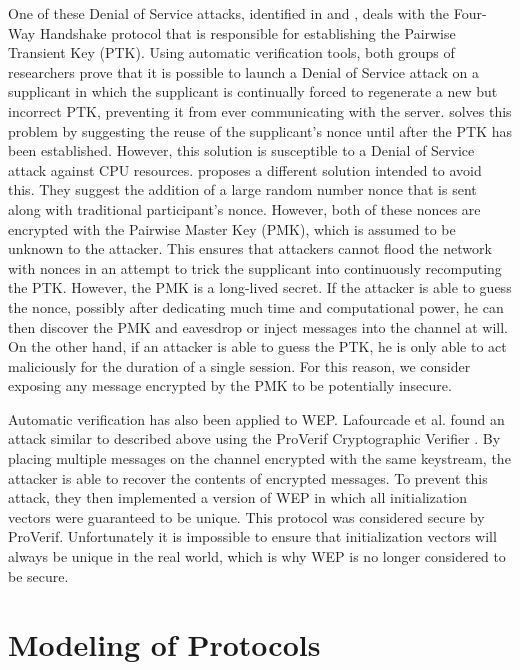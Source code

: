 \documentclass[11pt, twocolumn]{article} %
\begin{document}
One of these Denial of Service attacks, identified in \cite{he04} and \cite{liu08}, deals with the Four-Way Handshake protocol that is responsible for establishing the Pairwise Transient Key (PTK).  Using automatic verification tools, both groups of researchers prove that it is possible to launch a Denial of Service attack on a supplicant in which the supplicant is continually forced to regenerate a new but incorrect PTK, preventing it from ever communicating with the server.  \cite{he04} solves this problem by suggesting the reuse of the supplicant's nonce until after the PTK has been established.  However, this solution is susceptible to a Denial of Service attack against CPU resources.  \cite{liu08} proposes a different solution intended to avoid this.  They suggest the addition of a large random number nonce that is sent along with traditional participant's nonce.  However, both of these nonces are encrypted with the Pairwise Master Key (PMK), which is assumed to be unknown to the attacker.  This ensures that attackers cannot flood the network with nonces in an attempt to trick the supplicant into continuously recomputing the PTK.  However, the PMK is a long-lived secret.  If the attacker is able to guess the nonce, possibly after dedicating much time and computational power, he can then discover the PMK and eavesdrop or inject messages into the channel at will.  On the other hand, if an attacker is able to guess the PTK, he is only able to act maliciously for the duration of a single session.  For this reason, we consider exposing any message encrypted by the PMK to be potentially insecure.  

Automatic verification has also been applied to WEP.  Lafourcade et al. found an attack similar to \cite{borisov01} described above using the ProVerif Cryptographic Verifier \cite{lafourcade10}. By placing multiple messages on the channel encrypted with the same keystream, the attacker is able to recover the contents of encrypted messages.  To prevent this attack, they then implemented a version of WEP in which all initialization vectors were guaranteed to be unique.  This protocol was considered secure by ProVerif.  Unfortunately it is impossible to ensure that initialization vectors will always be unique in the real world, which is why WEP is no longer considered to be secure.
 
\section{Modeling of Protocols}
\label{sec:model}
\end{document}
